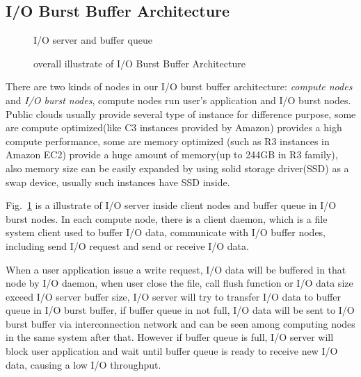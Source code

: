 \subsection{I/O Burst Buffer Architecture}

\begin{figure}[tb]
	\centering
	\caption{I/O server and buffer queue}
	\label{I/O server}
\end{figure}

\begin{figure}[tb]
	\centering
	\caption{overall illustrate of I/O Burst Buffer Architecture}
	\label{overview}
\end{figure}

There are two kinds of nodes in our I/O burst buffer architecture: \emph{compute nodes} and \emph{I/O burst nodes}, compute nodes run user's application and I/O burst nodes.
Public clouds usually provide several type of instance for difference purpose, some are compute optimized(like C3 instances provided by Amazon) provides a high compute performance,
some are memory optimized (such as R3 instances in Amazon EC2) provide a huge amount of memory(up to 244GB in R3 family), also memory size can be easily expanded by using solid storage driver(SSD) as a swap device, usually such instances have SSD inside.

Fig.~\ref{I/O server} is a illustrate of I/O server inside client nodes and buffer queue in I/O burst nodes.
In each compute node, there is a client daemon, which is a file system client used to buffer I/O data, communicate with I/O buffer nodes, including send I/O request and send or receive I/O data.

When a user application issue a write request, I/O data will be buffered in that node by I/O daemon, when user close the file, call flush function or I/O data size exceed I/O server buffer size, I/O server will try to transfer I/O data to buffer queue in I/O burst buffer, if buffer queue in not full, I/O data will be sent to I/O burst buffer via interconnection network and can be seen among computing nodes in the same system after that.
However if buffer queue is full, I/O server will block user application and wait until buffer queue is ready to receive new I/O data, causing a low I/O throughput.



